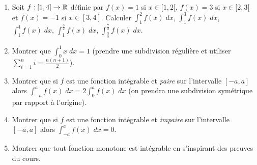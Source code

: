 \begin{frame}
\begin{miniexercice}
\begin{enumerate}
  \item Soit $f : [1,4] \to \mathbb{R}$ définie par $f(x)=1$ si $x\in[1,2[$, $f(x)=3$ si $x\in [2,3[$
et $f(x)=-1$ si $x \in [3,4]$. Calculer $\int_1^2 f(x) \;dx$, $\int_1^3 f(x)\;dx$, $\int_1^4 f(x)\;dx$,
$\int_1^{\frac32} f(x) \;dx$, $\int_{\frac32}^{\frac72} f(x) \;dx$.
  \item Montrer que $\int_0^1 x \; dx =1$ (prendre une subdivision régulière 
et utiliser $\sum_{i=1}^n i = \frac{n(n+1)}{2}$).
  \item Montrer que si $f$ est une fonction intégrable et \emph{paire} sur l'intervalle $[-a,a]$ alors
$\int_{-a}^a f(x)\;dx = 2 \int_0^a f(x)\; dx$ (on prendra une subdivision symétrique par rapport à l'origine).
  \item Montrer que si $f$ est une fonction intégrable et \emph{impaire} sur l'intervalle $[-a,a]$ alors
  $\int_{-a}^a f(x)\;dx = 0$.
  \item Montrer que tout fonction monotone est intégrable en s'inspirant des preuves du cours.
\end{enumerate}
\end{miniexercice}
\end{frame}


